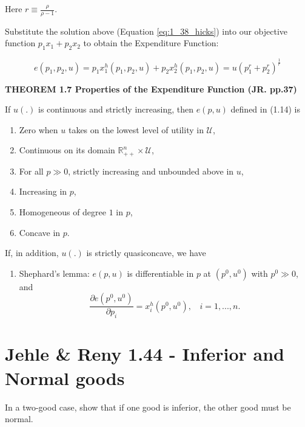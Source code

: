 \documentclass{article}
\newcommand{\R}{\mathbb{R}}
\begin{document}
\begin{mdframed}[backgroundcolor=blue!20,linecolor=white]
Here $r \equiv \frac{\rho}{\rho - 1}$.

Substitute the solution above (Equation \ref{eq:1_38_hicks}) into our
objective function  $p_1x_1 + p_2x_2$ to obtain the Expenditure Function:

$$e(p_1,p_2, u) = p_1x_1^h(p_1,p_2,u) + p_2x_2^h(p_1,p_2,u) = 
u(p_1^{r} + p_2^{r})^{\frac{1}{r}}$$


\textbf{THEOREM 1.7 Properties of the Expenditure Function (JR. pp.37)}

\medskip

If $u(.)$ is continuous and strictly increasing, then $e(p, u)$ defined in (1.14) is

\begin{enumerate}
\item Zero when $u$ takes on the lowest level of utility in $\mathcal{U}$,
\item Continuous on its domain $\R^n_{++} \times \mathcal{U}$,
\item For all $p \gg 0$, strictly increasing and unbounded above in $u$,
\item Increasing in $p$,
\item Homogeneous of degree $1$ in $p$,
\item Concave in $p$.
\end{enumerate}
If, in addition, $u(.)$ is strictly quasiconcave, we have
\begin{enumerate}[start = 7]
\item Shephard’s lemma: $e(p, u)$ is differentiable in $p$ at $(p^0, u^0)$ with $p^0 \gg 0$, and
$$\frac{\partial e(p^0, u^0)}{\partial p_i} = x^h_i (p^0, u^0), \ \ \ \ i = 1, . . . , n.$$
\end{enumerate}
\end{mdframed}


\subsection{}

















\section{Jehle \& Reny 1.44 - Inferior and Normal goods}
In a two-good case, show that if one good is inferior, the other good must be normal.
\end{document}
